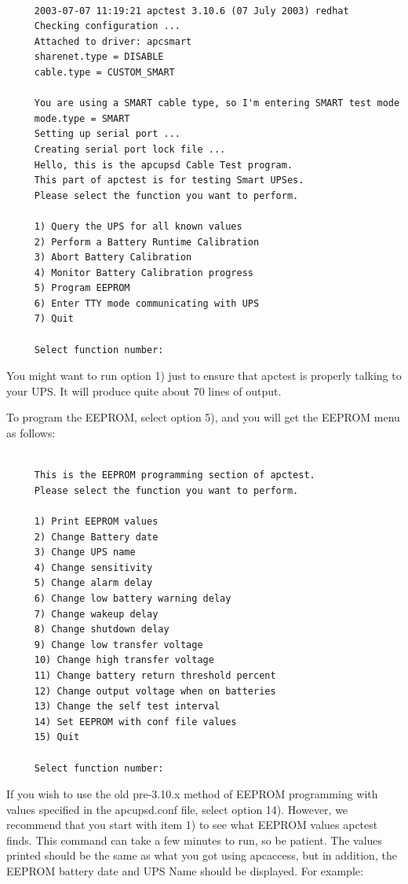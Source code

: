 \footnotesize
\begin{verbatim}
     
     2003-07-07 11:19:21 apctest 3.10.6 (07 July 2003) redhat
     Checking configuration ...
     Attached to driver: apcsmart
     sharenet.type = DISABLE
     cable.type = CUSTOM_SMART
     
     You are using a SMART cable type, so I'm entering SMART test mode
     mode.type = SMART
     Setting up serial port ...
     Creating serial port lock file ...
     Hello, this is the apcupsd Cable Test program.
     This part of apctest is for testing Smart UPSes.
     Please select the function you want to perform.
     
     1) Query the UPS for all known values
     2) Perform a Battery Runtime Calibration
     3) Abort Battery Calibration
     4) Monitor Battery Calibration progress
     5) Program EEPROM
     6) Enter TTY mode communicating with UPS
     7) Quit
     
     Select function number:
\end{verbatim}
\normalsize

You might want to run option 1) just to ensure that apctest is properly
talking to your UPS. It will produce quite about 70 lines of output.  

To program the EEPROM, select option 5), and you will get the EEPROM menu as
follows: 

\footnotesize
\begin{verbatim}
     
     This is the EEPROM programming section of apctest.
     Please select the function you want to perform.
     
     1) Print EEPROM values
     2) Change Battery date
     3) Change UPS name
     4) Change sensitivity
     5) Change alarm delay
     6) Change low battery warning delay
     7) Change wakeup delay
     8) Change shutdown delay
     9) Change low transfer voltage
     10) Change high transfer voltage
     11) Change battery return threshold percent
     12) Change output voltage when on batteries
     13) Change the self test interval
     14) Set EEPROM with conf file values
     15) Quit
     
     Select function number:
\end{verbatim}
\normalsize

If you wish to use the old pre-3.10.x method of EEPROM programming with values
specified in the apcupsd.conf file, select option 14). However, we recommend
that you start with item 1) to see what EEPROM values apctest finds. This
command can take a few minutes to run, so be patient. The values printed
should be the same as what you got using apcaccess, but in addition, the
EEPROM battery date and UPS Name should be displayed. For example: 

